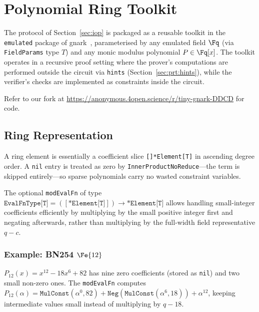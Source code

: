 
\section{Polynomial Ring Toolkit}
\label{sec:prt}

The protocol of Section~\ref{sec:iop} is packaged as a reusable toolkit in
the \texttt{emulated} package of gnark~\cite{gnaF}, parameterised by any
emulated field $\Fq$ (via \texttt{FieldParams} type $T$) and any monic modulus
polynomial $P \in \Fq[x]$. The toolkit operates in a recursive proof
setting where the prover's computations are performed outside the circuit
via \texttt{hints} (Section~\ref{sec:prt:hints}), while the verifier's
checks are implemented as constraints inside the circuit.

Refer to our fork at \url{https://anonymous.4open.science/r/tiny-gnark-DDCD} for code.

\subsection{Ring Representation}
\label{sec:prt:rep}

A ring element is essentially a coefficient slice \texttt{[]*Element[T]} in
ascending degree order. A \texttt{nil} entry is treated as zero by
\texttt{InnerProductNoReduce}---the term is skipped entirely---so sparse
polynomials carry no wasted constraint variables.

The optional \texttt{modEvalFn} of type
$\texttt{EvalFnType[T]} = ([\texttt{*Element[T]}]) \to \texttt{*Element[T]}$
allows handling small-integer coefficients efficiently by multiplying by the small positive
integer first and negating afterwards, rather than multiplying by the
full-width field representative $q - c$.

\subsubsection*{Example: BN254 $\Fe{12}$}
\label{sec:prt:rep:sparse}

$P_{12}(x) = x^{12} - 18x^6 + 82$ has nine zero coefficients (stored as
\texttt{nil}) and two small non-zero ones. The \texttt{modEvalFn} computes
$P_{12}(\alpha) = \texttt{MulConst}(\alpha^0, 82) + \texttt{Neg}(\texttt{MulConst}(\alpha^6, 18)) + \alpha^{12}$,
keeping intermediate values small instead of multiplying by $q - 18$.

